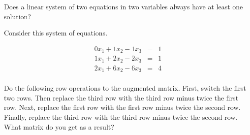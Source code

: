 \endedxproblem


Does a linear system of two equations in two variables always have at least one solution?



\endedxproblem






Consider this system of equations.  



\begin{eqnarray*}
0x_1 + 1x_2 - 1x_3 & = & 1 \\
1x_1 + 2x_2 - 2x_3 & = & 1 \\
2x_1 + 6x_2 - 6x_3 & = & 4 \\
\end{eqnarray*}





Do the following row operations to the augmented matrix.  First, switch the first two
rows.  Then replace the third row with the third
row minus twice the first row.  Next, replace the first row with the first
row minus twice the second row.  Finally, replace the third row with the third
row minus twice the second row.  What matrix do you get as a result?  








